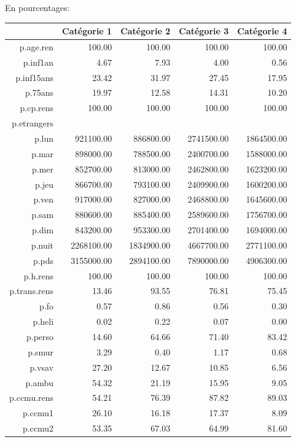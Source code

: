 \documentclass[]{article}
\begin{document}
En pourcentages:

\begin{table}[ht]
\centering
\begin{tabular}{rrrrr}
  \hline
 & Catégorie 1 & Catégorie 2 & Catégorie 3 & Catégorie 4 \\ 
  \hline
p.age.ren & 100.00 & 100.00 & 100.00 & 100.00 \\ 
  p.inf1an & 4.67 & 7.93 & 4.00 & 0.56 \\ 
  p.inf15ans & 23.42 & 31.97 & 27.45 & 17.95 \\ 
  p.75ans & 19.97 & 12.58 & 14.31 & 10.20 \\ 
  p.cp.rens & 100.00 & 100.00 & 100.00 & 100.00 \\ 
  p.etrangers &  &  &  &  \\ 
  p.lun & 921100.00 & 886800.00 & 2741500.00 & 1864500.00 \\ 
  p.mar & 898000.00 & 788500.00 & 2400700.00 & 1588000.00 \\ 
  p.mer & 852700.00 & 813000.00 & 2462800.00 & 1623200.00 \\ 
  p.jeu & 866700.00 & 793100.00 & 2409900.00 & 1600200.00 \\ 
  p.ven & 917000.00 & 827000.00 & 2468800.00 & 1645600.00 \\ 
  p.sam & 880600.00 & 885400.00 & 2589600.00 & 1756700.00 \\ 
  p.dim & 843200.00 & 953300.00 & 2701400.00 & 1694000.00 \\ 
  p.nuit & 2268100.00 & 1834900.00 & 4667700.00 & 2771100.00 \\ 
  p.pds & 3155000.00 & 2894100.00 & 7890000.00 & 4906300.00 \\ 
  p.h.rens & 100.00 & 100.00 & 100.00 & 100.00 \\ 
  p.trans.rens & 13.46 & 93.55 & 76.81 & 75.45 \\ 
  p.fo & 0.57 & 0.86 & 0.56 & 0.30 \\ 
  p.heli & 0.02 & 0.22 & 0.07 & 0.00 \\ 
  p.perso & 14.60 & 64.66 & 71.40 & 83.42 \\ 
  p.smur & 3.29 & 0.40 & 1.17 & 0.68 \\ 
  p.vsav & 27.20 & 12.67 & 10.85 & 6.56 \\ 
  p.ambu & 54.32 & 21.19 & 15.95 & 9.05 \\ 
  p.ccmu.rens & 54.21 & 76.39 & 87.82 & 89.03 \\ 
  p.ccmu1 & 26.10 & 16.18 & 17.37 & 8.09 \\ 
  p.ccmu2 & 53.35 & 67.03 & 64.99 & 81.60 \\ 

\end{tabular}
\end{table}
\end{document}
